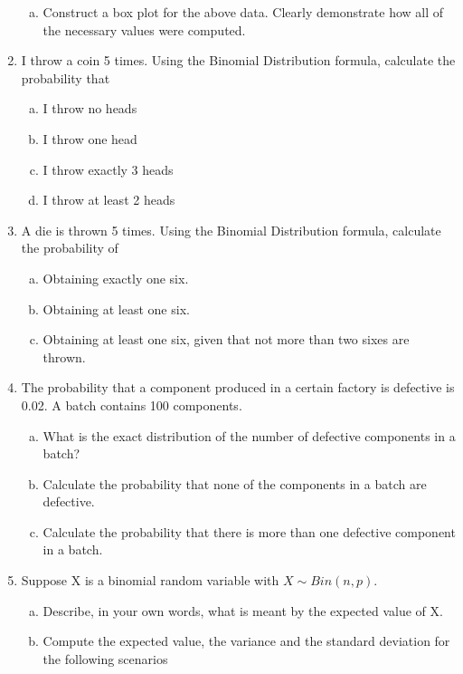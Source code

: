 \documentclass[a4paper,12pt]{article}
\begin{document}
\begin{enumerate}
\begin{enumerate}[(a)]
\item Construct a box plot for the above data. Clearly demonstrate how all of the necessary values were computed.
\end{enumerate}




\item
I throw a coin 5 times.  Using the Binomial Distribution formula, calculate the probability that
\begin{multicols}{2}
\begin{enumerate}[(a)]
\item  I throw no heads
\item  I throw one head
\item  I throw exactly 3 heads
\item  I throw at least 2 heads
\end{enumerate}
\end{multicols}
\newpage
\item 
A die is thrown 5 times. Using the Binomial Distribution formula, calculate the probability of
\begin{enumerate}[(a)]
\item  Obtaining exactly one six.
\item  Obtaining at least one six.
\item  Obtaining at least one six, given that not more than two sixes are thrown.
\end{enumerate}

\item
The probability that a component produced in a certain factory is defective is 0.02. A batch contains 100
components.
\begin{enumerate}[(a)]
\item  What is the exact distribution of the number of defective components in a batch?
\item  Calculate the probability that none of the components in a batch are defective.
\item  Calculate the probability that there is more than one defective component in a batch.
\end{enumerate}

\item
Suppose X is a binomial random variable with
$X \sim Bin(n, p)$.
\begin{enumerate}[(a)]
\item  Describe, in your own words, what is meant by the expected value of X.
\item  Compute the expected value, the variance and the standard deviation for the following scenarios


\end{enumerate}
\end{enumerate}
\end{document}

